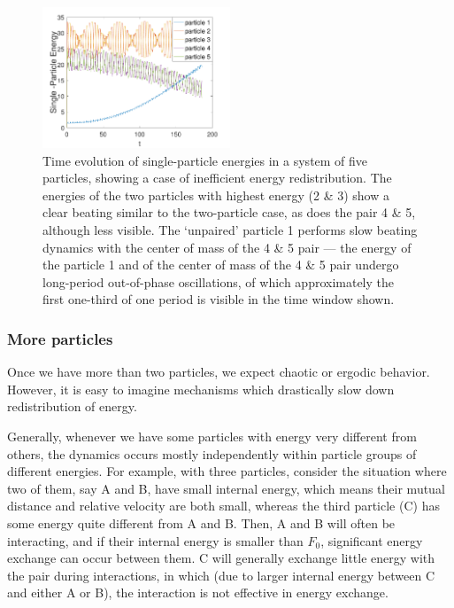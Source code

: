 \documentclass[a4paper, onecolumn]{revtex4-1}
\begin{document}
\begin{figure}[tb]
\centering
\includegraphics[width=0.5\textwidth]{ZhiyuPictures/N_5_F0_unknown_E_100_Single_Particle_Energy.pdf}
\caption{Time evolution of single-particle energies in a system of five particles, showing a case of
  inefficient energy redistribution.  The energies of the two particles with highest energy (2 \& 3)
  show a clear beating similar to the two-particle case, as does the pair 4 \& 5, although less
  visible.  The `unpaired' particle 1 performs slow beating dynamics with the center of mass of the
  4 \& 5 pair --- the energy of the particle 1 and of the center of mass of the 4 \& 5 pair undergo
  long-period out-of-phase oscillations, of which approximately the first one-third of one period is
  visible in the time window shown.}
\label{fig:thermalization4}
\end{figure}



\subsubsection{More particles}

Once we have more than two particles, we expect chaotic or ergodic behavior.  However, it is easy to
imagine mechanisms which drastically slow down redistribution of energy.

Generally, whenever we have some particles with energy very different from others, the dynamics
occurs mostly independently within particle groups of different energies.  For example, with three
particles, consider the situation where two of them, say A and B, have small internal energy, which
means their mutual distance and relative velocity are both small, whereas the third particle (C) has
some energy quite different from A and B.
%
Then, A and B will often be interacting, and if their internal energy is smaller than $F_0$,
significant energy exchange can occur between them.  C will generally exchange little energy with
the pair during interactions, in which (due to larger internal energy between C and either A or B),
the interaction is not effective in energy exchange.
\end{document}
